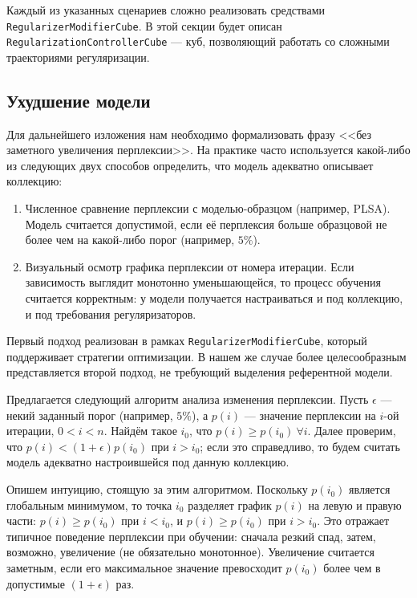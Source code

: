 Каждый из указанных сценариев сложно реализовать средствами \texttt{RegularizerModifierCube}. В этой секции будет описан \texttt{RegularizationControllerCube} --- куб, позволяющий работать со сложными траекториями регуляризации.  

\subsection{Ухудшение модели} 

Для дальнейшего изложения нам необходимо формализовать фразу <<без заметного увеличения перплексии>>. На практике часто используется какой-либо из следующих двух способов определить, что модель адекватно описывает коллекцию: 

\begin{enumerate}
    \item Численное сравнение перплексии с моделью-образцом (например, PLSA). Модель считается допустимой, если её перплексия больше образцовой не более чем на какой-либо порог (например, $5\%$).
    \item Визуальный осмотр графика перплексии от номера итерации. Если зависимость выглядит монотонно уменьшающейся, то процесс обучения считается корректным: у модели получается настраиваться и под коллекцию, и под требования регуляризаторов.
\end{enumerate} 

Первый подход реализован в рамках \texttt{RegularizerModifierCube}, который поддерживает стратегии оптимизации. В нашем же случае более целесообразным представляется второй подход, не требующий выделения референтной модели.  

Предлагается следующий алгоритм анализа изменения перплексии. Пусть $\epsilon$ --- некий заданный порог (например, $5\%$), а  $p(i)$ --- значение перплексии на $i$-ой итерации, $0 < i < n$. Найдём такое $i_0$, что $p(i) \geq p(i_0)~\forall i$. Далее проверим, что $p(i) < (1 + \epsilon) p(i_0)$ при $i > i_0$; если это справедливо, то будем считать модель адекватно настроившейся под данную коллекцию.  

Опишем интуицию, стоящую за этим алгоритмом. Поскольку $p(i_0)$ является глобальным минимумом, то точка $i_0$ разделяет график $p(i)$ на левую и правую части: $p(i) \geq p(i_0)$ при $i < i_0$, и $p(i) \geq p(i_0)$ при $i > i_0$. Это отражает типичное поведение перплексии при обучении: сначала резкий спад, затем, возможно, увеличение (не обязательно монотонное). Увеличение считается заметным, если его максимальное значение превосходит $p(i_0)$ более чем в допустимые $(1 + \epsilon)$ раз.  

